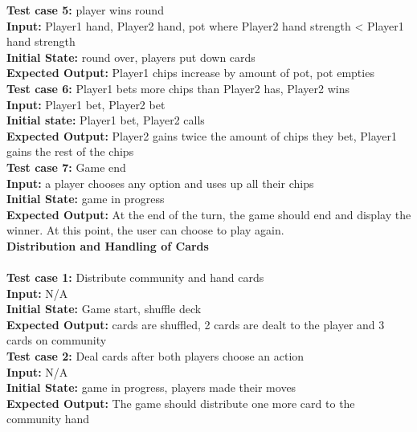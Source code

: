 \documentclass[12pt]{article}
\begin{document}
    \noindent \textbf{Test case 5:} player wins round\\
    \textbf{Input:} Player1 hand, Player2 hand, pot where Player2 hand strength < Player1 hand 
    strength\\
    \textbf{Initial State:} round over, players put down cards\\
    \textbf{Expected Output:} Player1 chips increase by amount of pot, pot empties\\

    \noindent \textbf{Test case 6:} Player1 bets more chips than Player2 has, Player2 wins\\
    \textbf{Input:} Player1 bet, Player2 bet\\
    \textbf{Initial state:} Player1 bet, Player2 calls\\
    \textbf{Expected Output:} Player2 gains twice the amount of chips they bet, Player1 gains the
    rest of the chips\\

    \noindent \textbf{Test case 7:} Game end\\
	\textbf{Input:} a player chooses any option and uses up all their chips\\
	\textbf{Initial State:} game in progress\\
	\textbf{Expected Output:} At the end of the turn, the game should end and display the winner. At this point, the user can choose to play again. \\

    \noindent \textbf{Distribution and Handling of Cards}\\
    \\
    \textbf{Test case 1:} Distribute community and hand cards\\
    \textbf{Input:} N/A\\
	\textbf{Initial State:} Game start, shuffle deck\\
	\textbf{Expected Output:} cards are shuffled, 2 cards are dealt to the player and 3 cards on community\\

   	\noindent \textbf{ Test case 2:} Deal cards after both players choose an action\\
    \textbf{Input:} N/A\\
    \textbf{Initial State:} game in progress, players made their moves\\
    \textbf{Expected Output:} The game should distribute one more card to the community hand\\
\end{document}
